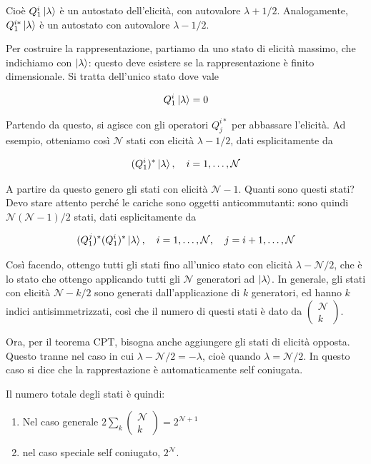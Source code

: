 \documentclass{report}
\begin{document}
Cioè \(Q_1^i\ket{\lambda}\) è un autostato dell'elicità, con autovalore \(\lambda + 1/2\). Analogamente, \(Q^{i*}_1\ket{\lambda}\) è un autostato con autovalore \(\lambda - 1/2\). 

Per costruire la rappresentazione, partiamo da uno stato di elicità massimo, che indichiamo con \(\ket{\lambda}\): questo deve esistere se la rappresentazione è finito dimensionale. Si tratta dell'unico stato dove vale 

\begin{align}
    Q^i_1 \ket{\lambda} = 0 
\end{align}

Partendo da questo, si agisce con gli operatori \(Q^{i*}_j\) per abbassare l'elicità. Ad esempio, otteniamo così \(\mathcal{N}\) stati con elicità \(\lambda -1/2\), dati esplicitamente da 

\begin{align}
    (Q_1^i)^* \ket{\lambda}, \quad i = 1, \ldots, \mathcal{N}
\end{align}

A partire da questo genero gli stati con elicità \(\mathcal{N}-1\). Quanti sono questi stati? Devo stare attento perché le cariche sono oggetti anticommutanti: sono quindi \(\mathcal{N}(\mathcal{N}-1)/2\) stati, dati esplicitamente da 

\begin{align}
    (Q_1^j)^*(Q_1^i)^*\ket{\lambda}, \quad i = 1, \ldots, \mathcal{N}, \quad j = i+1, \ldots, \mathcal{N}
\end{align}

Così facendo, ottengo tutti gli stati fino all'unico stato con elicità \(\lambda - \mathcal{N}/2\), che è lo stato che ottengo applicando tutti gli \(\mathcal{N}\) generatori ad \(\ket{\lambda}\). In generale, gli stati con elicità \(\mathcal{N} - k/2\) sono generati dall'applicazione di \(k\) generatori, ed hanno \(k\) indici antisimmetrizzati, così che il numero di questi stati è dato da \(\begin{pmatrix}
    \mathcal{N} \\ k
\end{pmatrix}\). 

Ora, per il teorema CPT, bisogna anche aggiungere gli stati di elicità opposta. Questo tranne nel caso in cui \(\lambda - \mathcal{N}/2 = -\lambda\), cioè quando \(\lambda = \mathcal{N}/2\). In questo caso si dice che la rapprestazione è automaticamente self coniugata. 

Il numero totale degli stati è quindi: 
\begin{enumerate}
    \item Nel caso generale \(2\sum_k \begin{pmatrix}
        \mathcal{N} \\ k 
    \end{pmatrix} = 2^{\mathcal{N}+1}\) 
    \item nel caso speciale self coniugato, \(2^\mathcal{N}\). 
\end{enumerate}
\end{document}
